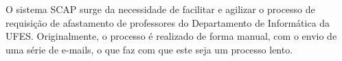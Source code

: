 

O sistema SCAP surge da necessidade de facilitar e agilizar o processo de requisição de afastamento de 
professores do Departamento de Informática da UFES. Originalmente, o processo é realizado 
de forma manual, com o envio de uma série de e-mails, o que faz com que este seja um processo lento.

